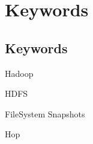 \chapter*{Keywords}
\thispagestyle{empty}

\section*{Keywords}

{\large %

\noindent Hadoop

\noindent HDFS

\noindent FileSystem Snapshots

\noindent Hop

}

\vfill

\cleardoublepage



\pagestyle{plain}



\def\contentsname{Index}
\tableofcontents
\newpage

\listoffigures
\newpage

\listoftables


\cleardoublepage


